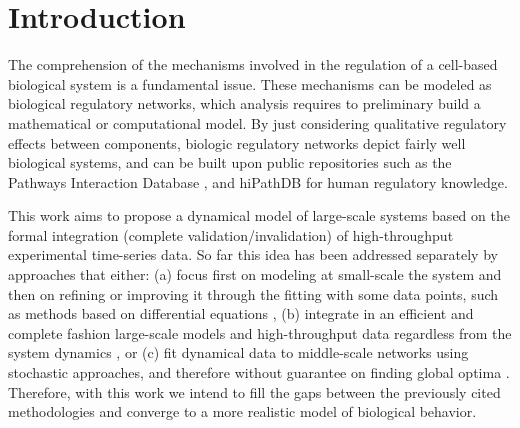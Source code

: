 
\section{Introduction}






The comprehension of the mechanisms involved in the regulation of a cell-based biological system is a fundamental 
issue. These mechanisms can be modeled as biological regulatory networks, which analysis requires to preliminary build a 
mathematical or computational model. 
By just considering qualitative regulatory effects between components, biologic regulatory networks
depict fairly well biological systems, and can be built upon public repositories such as the Pathways 
Interaction Database \cite{schaefer2009pid}, and 
hiPathDB\cite{yu2012hipathdb} for human regulatory knowledge.


This work aims to propose a dynamical model of large-scale systems based on the formal integration 
(complete validation/invalidation) of high-throughput experimental time-series data.  So far this 
idea has been addressed separately by approaches that either: (a) focus first on
modeling at small-scale the system and then on refining or improving it through the fitting with
some data points, such as methods based on differential equations \cite{tyson2003sniffers,batt2005validation,mobashir2012simulated}, 
(b) integrate in an efficient and complete fashion large-scale models
and high-throughput data regardless from the system dynamics \cite{guziolowski2013exhaustively,mitsos2009identifying}, or 
(c) fit dynamical data to middle-scale networks using stochastic approaches, and
therefore without guarantee on finding global optima \cite{macnamara2012state}. Therefore, with this
work we intend to fill the gaps between the previously cited methodologies and converge to a more
realistic model of biological behavior.


